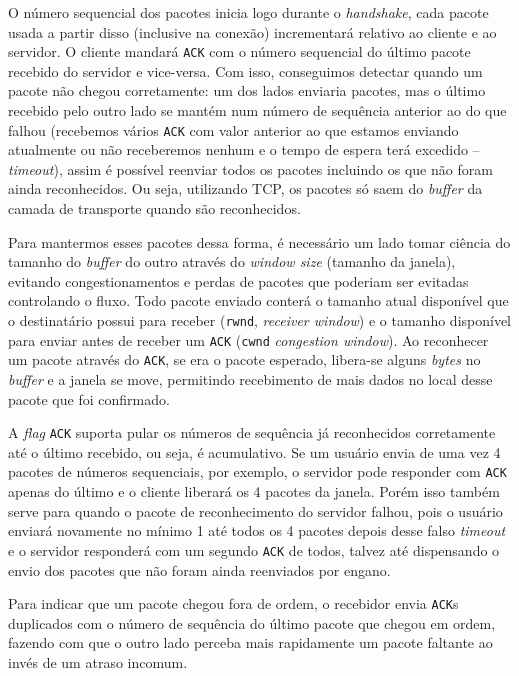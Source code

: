 \documentclass[brazilian,a4paper,twocolumn]{article}
\begin{document}
O número sequencial dos pacotes inicia logo durante o \textit{handshake}, cada pacote usada a partir disso (inclusive na conexão) incrementará relativo ao cliente e ao servidor. O cliente mandará \texttt{ACK} com o número sequencial do último pacote recebido do servidor e vice-versa. Com isso, conseguimos detectar quando um pacote não chegou corretamente: um dos lados enviaria pacotes, mas o último recebido pelo outro lado se mantém num número de sequência anterior ao do que falhou (recebemos vários \texttt{ACK} com valor anterior ao que estamos enviando atualmente ou não receberemos nenhum e o tempo de espera terá excedido -- \textit{timeout}), assim é possível reenviar todos os pacotes incluindo os que não foram ainda reconhecidos. Ou seja, utilizando TCP, os pacotes só saem do \textit{buffer} da camada de transporte quando são reconhecidos.

Para mantermos esses pacotes dessa forma, é necessário um lado tomar ciência do tamanho do \textit{buffer} do outro através do \textit{window size} (tamanho da janela), evitando congestionamentos e perdas de pacotes que poderiam ser evitadas controlando o fluxo. Todo pacote enviado conterá o tamanho atual disponível que o destinatário possui para receber (\texttt{rwnd}, \textit{receiver window}) e o tamanho disponível para enviar antes de receber um \texttt{ACK} (\texttt{cwnd} \textit{congestion window}). Ao reconhecer um pacote através do \texttt{ACK}, se era o pacote esperado, libera-se alguns \textit{bytes} no \textit{buffer} e a janela se move, permitindo recebimento de mais dados no local desse pacote que foi confirmado.

A \textit{flag} \texttt{ACK} suporta pular os números de sequência já reconhecidos corretamente até o último recebido, ou seja, é acumulativo. Se um usuário envia de uma vez 4 pacotes de números sequenciais, por exemplo, o servidor pode responder com \texttt{ACK} apenas do último e o cliente liberará os 4 pacotes da janela. Porém isso também serve para quando o pacote de reconhecimento do servidor falhou, pois o usuário enviará novamente no mínimo 1 até todos os 4 pacotes depois desse falso \textit{timeout} e o servidor responderá com um segundo \texttt{ACK} de todos, talvez até dispensando o envio dos pacotes que não foram ainda reenviados por engano.

Para indicar que um pacote chegou fora de ordem, o recebidor envia \texttt{ACK}s duplicados com o número de sequência do último pacote que chegou em ordem, fazendo com que o outro lado perceba mais rapidamente um pacote faltante ao invés de um atraso incomum.
\end{document}
